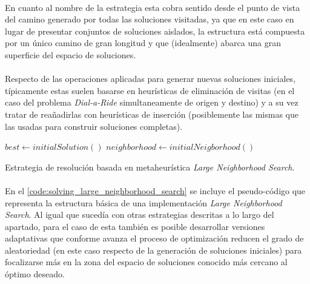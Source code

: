 \documentclass{subfiles}
\begin{document}
        \paragraph{}
        En cuanto al nombre de la estrategia esta cobra sentido desde el punto de vista del camino generado por todas las soluciones visitadas, ya que en este caso en lugar de presentar conjuntos de soluciones aislados, la estructura está compuesta por un único camino de gran longitud y que (idealmente) abarca una gran superficie del espacio de soluciones.

        \paragraph{}
        Respecto de las operaciones aplicadas para generar nuevas soluciones iniciales, típicamente estas suelen basarse en heurísticas de eliminación de visitas (en el caso del problema \emph{Dial-a-Ride} simultaneamente de origen y destino) y a su vez tratar de reañadirlas con heurísticas de inserción (posiblemente las mismas que las usadas para construir soluciones completas).

        \begin{algorithm}[ht]
          \SetAlgoLined
          $best \gets initialSolution()$\;
          $neighborhood \gets initialNeigborhood()$\;
          \caption{Estrategia de resolución basada en metaheurística \emph{Large Neighborhood Search}.}
          \label{code:solving_large_neighborhood_search}
        \end{algorithm}

        \paragraph{}
        En el \cref{code:solving_large_neighborhood_search} se incluye el pseudo-código que representa la estructura básica de una implementación \emph{Large Neighborhood Search}. Al igual que sucedía con otras estrategias descritas a lo largo del apartado, para el caso de esta también es posible desarrollar versiones adaptativas que conforme avanza el proceso de optimización reducen el grado de aleatoriedad (en este caso respecto de la generación de soluciones iniciales) para focalizarse más en la zona del espacio de soluciones conocido más cercano al óptimo deseado.
\end{document}
